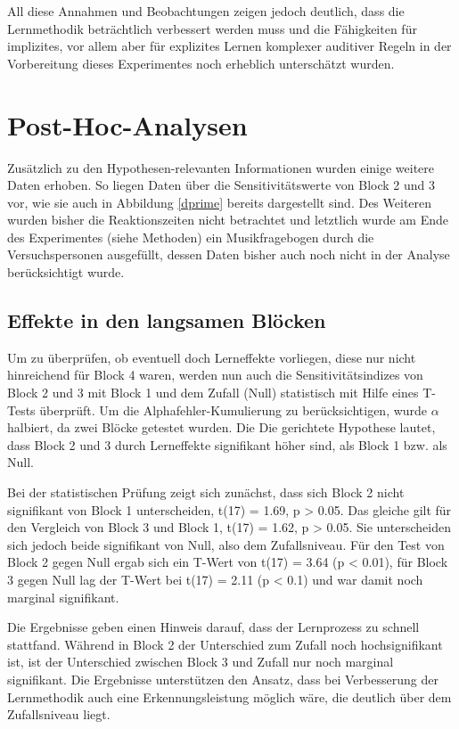 \documentclass[doc,a4paper,12pt]{apa6}
\begin{document}
All diese Annahmen und Beobachtungen zeigen jedoch deutlich, dass die Lernmethodik beträchtlich verbessert werden muss und die Fähigkeiten für implizites, vor allem aber für explizites Lernen komplexer auditiver Regeln in der Vorbereitung dieses Experimentes noch erheblich unterschätzt wurden.

\section{Post-Hoc-Analysen}

Zusätzlich zu den Hypothesen-relevanten Informationen wurden einige weitere Daten erhoben. So liegen Daten über die Sensitivitätswerte von Block 2 und 3 vor, wie sie auch in Abbildung \ref{dprime} bereits dargestellt sind. Des Weiteren wurden bisher die Reaktionszeiten nicht betrachtet und letztlich wurde am Ende des Experimentes (siehe Methoden) ein Musikfragebogen durch die Versuchspersonen ausgefüllt, dessen Daten bisher auch noch nicht in der Analyse berücksichtigt wurde.

\subsection{Effekte in den langsamen Blöcken}

Um zu überprüfen, ob eventuell doch Lerneffekte vorliegen, diese nur nicht hinreichend für Block 4 waren, werden nun auch die Sensitivitätsindizes von Block 2 und 3 mit Block 1 und dem Zufall (Null) statistisch mit Hilfe eines T-Tests überprüft. Um die Alphafehler-Kumulierung zu berücksichtigen, wurde $\alpha$ halbiert, da zwei Blöcke getestet wurden. Die Die gerichtete Hypothese lautet, dass Block 2 und 3 durch Lerneffekte signifikant höher sind, als Block 1 bzw. als Null.

Bei der statistischen Prüfung zeigt sich zunächst, dass sich Block 2 nicht signifikant von Block 1 unterscheiden, t(17) = 1.69, p > 0.05. Das gleiche gilt für den Vergleich von Block 3 und Block 1, t(17) = 1.62, p > 0.05. Sie unterscheiden sich jedoch beide signifikant von Null, also dem Zufallsniveau. Für den Test von Block 2 gegen Null ergab sich ein T-Wert von t(17) = 3.64 (p < 0.01), für Block 3 gegen Null lag der T-Wert bei t(17) = 2.11 (p < 0.1) und war damit noch marginal signifikant.

Die Ergebnisse geben einen Hinweis darauf, dass der Lernprozess zu schnell stattfand. Während in Block 2 der Unterschied zum Zufall noch hochsignifikant ist, ist der Unterschied zwischen Block 3 und Zufall nur noch marginal signifikant. Die Ergebnisse unterstützen den Ansatz, dass bei Verbesserung der Lernmethodik auch eine Erkennungsleistung möglich wäre, die deutlich über dem Zufallsniveau liegt.
\end{document}
